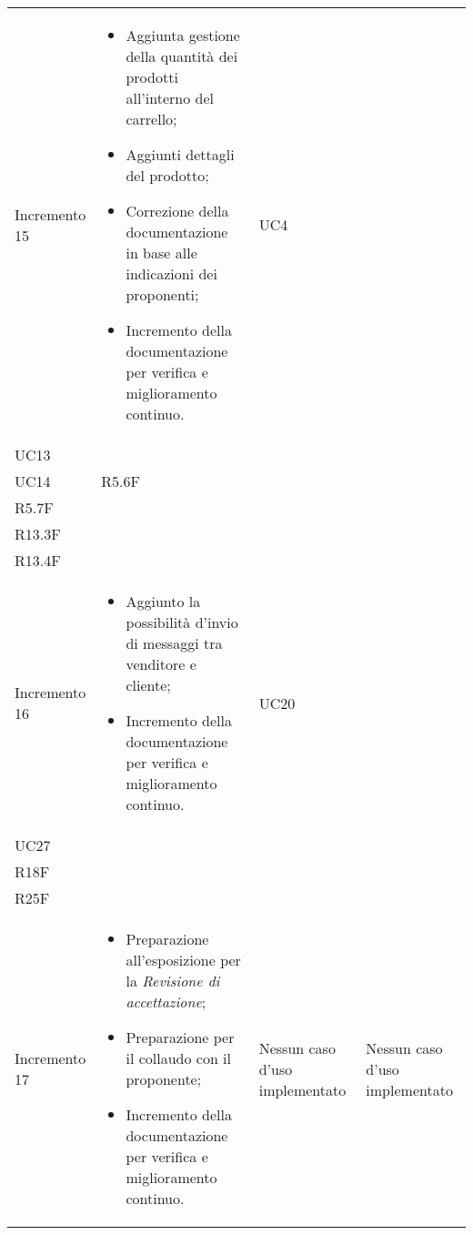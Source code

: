 \begin{longtable}{
    >{\centering}p{}
    >{\raggedright}p{}
    >{\centering}p{}
    >{\centering}p{}
    }
    \tabularnewline
    Incremento 15                 & \vspace{-15px}
    \begin{itemize}
        \renewcommand\labelitemi{-}
        \item Aggiunta gestione della quantità dei prodotti all'interno del carrello;
        \item Aggiunti dettagli del prodotto;
        \item Correzione della documentazione in base alle indicazioni dei proponenti;
        \item Incremento della documentazione per verifica e miglioramento continuo.
    \end{itemize}    & UC4                                                                                            \\ UC13 \\ UC14   & R5.6F \\ R5.7F \\ R13.3F \\ R13.4F
    \tabularnewline
    Incremento 16                 & \vspace{-15px}
    \begin{itemize}
        \renewcommand\labelitemi{-}
        \item Aggiunto la possibilità d'invio di messaggi tra venditore e cliente;
        \item Incremento della documentazione per verifica e miglioramento continuo.
    \end{itemize}    & UC20                                                                                           \\ UC27  & \\ R18F \\ R25F
    \tabularnewline

    Incremento 17                 & \vspace{-15px}
    \begin{itemize}
        \renewcommand\labelitemi{-}
        \item Preparazione all'esposizione per la \textit{Revisione di accettazione};
        \item Preparazione per il collaudo con il proponente;
        \item Incremento della documentazione per verifica e miglioramento continuo.
    \end{itemize}    & Nessun caso d'uso implementato & Nessun caso d'uso implementato
    \tabularnewline
\end{longtable}
\renewcommand{\arraystretch}{1}